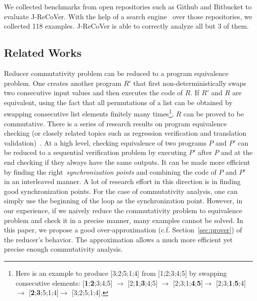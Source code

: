 \documentclass{llncs}
\begin{document}
We collected benchmarks from open repositories such as Github and Bitbucket to evaluate J-ReCoVer. With the help of a search engine~\cite{searchcode} over those repositories, we collected 118 examples. J-ReCoVer is able to correctly analyze all but 3 of them.


\subsection*{Related Works}
Reducer commutativity problem can be reduced to a program equivalence problem. One creates another program $R'$ that first non-deterministically swaps two consecutive input values and then executes the code of $R$. If $R'$ and $R$ are equivalent, using the fact that all permutations of a list can be obtained by swapping consecutive list elements finitely many times\footnote{Here is an example to produce [3;2;5;1;4] from [1;2;3;4;5] by swapping consecutive elements: [\textbf{1};\textbf{2};3;4;5] $\rightarrow$ [2;\textbf{1};\textbf{3};4;5] $\rightarrow$ [2;3;1;\textbf{4};\textbf{5}]$\rightarrow$ [2;3;\textbf{1};\textbf{5};4]$\rightarrow$ [\textbf{2};\textbf{3};5;1;4]$\rightarrow$ [3;2;5;1;4].}, $R$ can be proved to be commutative. There is a series of research results on program equivalence checking (or closely related topics such as regression verification and translation validation)~\cite{Pnueli:1998:TV,symdiff,fedyukovich2015automated,sharma2013data,godlin2009regression,fedyukovich2016property,felsing2014automating,KieferKlebanovUlbrich2017,lahiri2013differential,grossman2017verifying,barthe2011relational,KlebanovRuemmerUlbrich2017}. At a high level, checking equivalence of two programs $P$ and $P'$ can be reduced to a sequential verification problem by executing $P'$ after $P$ and at the end checking if they always have the same outputs. It can be made more efficient by finding the right~\emph{synchronization points} and combining the code of $P$ and $P'$ in an interleaved manner. A lot of research effort in this direction is in finding good synchronization points. For the case of commutativity analysis, one can simply use the beginning of the loop as the synchronization point. However, in our experience, if we naively reduce the commutativity problem to equivalence problem and check it in a precise manner, many examples cannot be solved. In this paper, we propose a good over-approximation (c.f. Section~\ref{sec:prover}) of the reducer's behavior. The approximation allows a much more efficient yet precise enough commutativity analysis.
\end{document}
